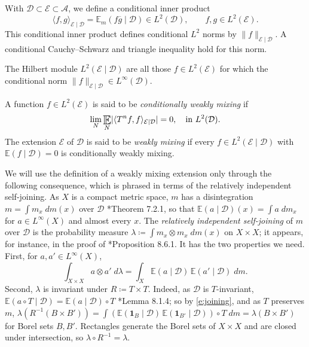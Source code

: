 With $\mathcal D\subset \mathcal E \subset \mathcal A$, we define a conditional inner product 
\begin{equation}
    \langle f,g \rangle _{\mathcal E\mid \mathcal D } 
    = \mathbb{E}_m  (f\overline g \mid \mathcal D) 
    \in L^2(\mathcal D) , \qquad 
    f,g\in L^2(\mathcal E). 
\end{equation}
This conditional inner product defines conditional  $L^2$ norms by 
$ \lVert f \rVert _{ \mathcal E \mid \mathcal  D }$. 
A conditional Cauchy--Schwarz and triangle inequality hold for this norm. 

\begin{definition}
    The Hilbert module $L^2(\mathcal E\mid \mathcal D)$ 
    are all those $f\in L^2(\mathcal E)$ for which the conditional norm  $\lVert f \rVert _{ \mathcal E \mid \mathcal  D } \in L^\infty (\mathcal D)$. 
\end{definition}


\begin{definition}
    A function $f\in L^2 (\mathcal E) $ is said to be \emph{conditionally weakly mixing} if  
    \begin{equation}
        \lim_N \Expectation_{N} 
        \lvert \langle T^nf,f\rangle _{\mathcal E\mid \mathcal D} 
        \rvert =0, \quad \textup{in $L^2(\mathcal D)$} . 
    \end{equation}
The extension $\mathcal E$ of $\mathcal D$ is said to be \emph{weakly mixing} if every $f\in L^2 (\mathcal E \mid \mathcal D) $ with $\mathbb E(f\mid \mathcal D)=0$  is conditionally weakly mixing. 
\end{definition}

We will use the definition of a weakly mixing extension only through the following consequence, 
which is phrased in terms of the relatively independent self-joining.  
As $X$ is a compact metric space, $m$ has a disintegration $m = \int m_x \;dm(x)$ over $\mathcal D$ \cite{MoreiraNotes}*{Theorem 7.2.1}, 
so that $\mathbb E(a\mid \mathcal D)(x) = \int a \;dm_x$ for $a \in L ^{\infty}(X)$ and almost every $x$.  
The \emph{relatively independent self-joining} of $m$ over $\mathcal D$ is the probability measure 
$\lambda \coloneqq \int m_x \otimes m_x \;dm(x)$ on $X \times X$; it appears, for instance, in the proof of \cite{MoreiraNotes}*{Proposition 8.6.1}.  
It has the two properties we need.  First, for $a, a' \in L ^{\infty}(X)$, 
\begin{equation} \label{e:joining}
\int_{X \times X} a \otimes a' \;d \lambda = \int_X \mathbb E(a\mid \mathcal D)\, \mathbb E(a'\mid \mathcal D)\;dm . 
\end{equation}
Second, $\lambda$ is invariant under $R \coloneqq T \times T$.  Indeed, as $\mathcal D$ is $T$-invariant, $\mathbb E(a\circ T\mid \mathcal D) = \mathbb E(a\mid \mathcal D)\circ T$ 
\cite{MoreiraNotes}*{Lemma 8.1.4}; so by \eqref{e:joining}, and as $T$ preserves $m$, 
$\lambda(R ^{-1}(B\times B')) = \int (\mathbb E(\mathbf 1_B\mid \mathcal D)\, \mathbb E(\mathbf 1_{B'}\mid \mathcal D))\circ T\;dm = \lambda(B\times B')$ 
for Borel sets $B, B'$.  Rectangles generate the Borel sets of $X \times X$ and are closed under intersection, so $\lambda \circ R ^{-1} = \lambda$.  

